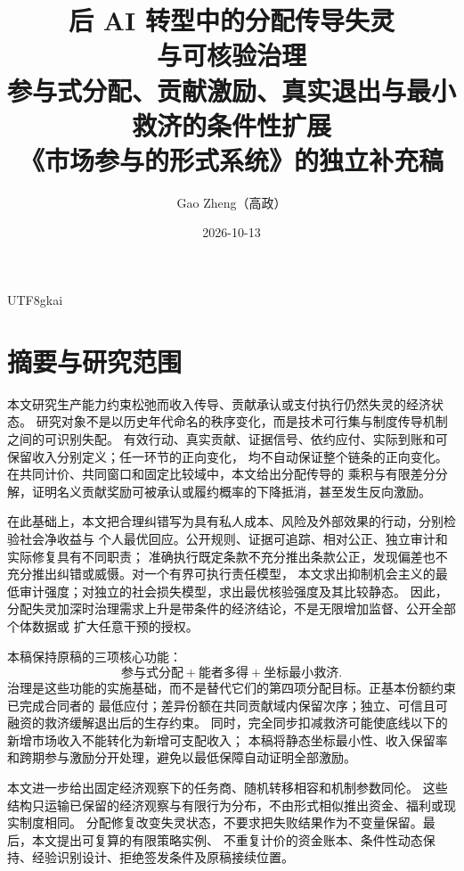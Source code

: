 \documentclass[12pt,a4paper,openany]{report}
\newcommand{\Original}{原稿}
\begin{document}
\begin{CJK*}{UTF8}{gkai}
\raggedbottom
{}
\title{后 AI 转型中的分配传导失灵\\与可核验治理\\[0.6em]
\large 参与式分配、贡献激励、真实退出与最小救济的条件性扩展\\[0.5em]
\normalsize 《市场参与的形式系统》的独立补充稿}
\author{Gao Zheng（高政）}
\date{2026-10-13}
\maketitle
\setcounter{page}{2}

\chapter*{摘要与研究范围}

本文研究生产能力约束松弛而收入传导、贡献承认或支付执行仍然失灵的经济状态。
研究对象不是以历史年代命名的秩序变化，而是技术可行集与制度传导机制之间的可识别失配。
有效行动、真实贡献、证据信号、依约应付、实际到账和可保留收入分别定义；任一环节的正向变化，
均不自动保证整个链条的正向变化。在共同计价、共同窗口和固定比较域中，本文给出分配传导的
乘积与有限差分分解，证明名义贡献奖励可被承认或履约概率的下降抵消，甚至发生反向激励。

在此基础上，本文把合理纠错写为具有私人成本、风险及外部效果的行动，分别检验社会净收益与
个人最优回应。公开规则、证据可追踪、相对公正、独立审计和实际修复具有不同职责；
准确执行既定条款不充分推出条款公正，发现偏差也不充分推出纠错或威慑。对一个有界可执行责任模型，
本文求出抑制机会主义的最低审计强度；对独立的社会损失模型，求出最优核验强度及其比较静态。
因此，分配失灵加深时治理需求上升是带条件的经济结论，不是无限增加监督、公开全部个体数据或
扩大任意干预的授权。

本稿保持\Original\cite{SourceMarket}的三项核心功能：
\[
\boxed{\text{参与式分配}+\text{能者多得}+\text{坐标最小救济}}.
\]
治理是这些功能的实施基础，而不是替代它们的第四项分配目标。正基本份额约束已完成合同者的
最低应付；差异份额在共同贡献域内保留次序；独立、可信且可融资的救济缓解退出后的生存约束。
同时，完全同步扣减救济可能使底线以下的新增市场收入不能转化为新增可支配收入；
本稿将静态坐标最小性、收入保留率和跨期参与激励分开处理，避免以最低保障自动证明全部激励。

本文进一步给出固定经济观察下的任务商、随机转移相容和机制参数同伦。
这些结构只运输已保留的经济观察与有限行为分布，不由形式相似推出资金、福利或现实制度相同。
分配修复改变失灵状态，不要求把失败结果作为不变量保留。最后，本文提出可复算的有限策略实例、
不重复计价的资金账本、条件性动态保持、经验识别设计、拒绝签发条件及原稿接续位置。


\end{CJK*}
\end{document}
